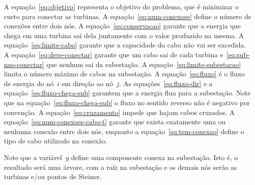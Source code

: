 A equação~\eqref{eq:objetivo} representa o objetivo do problema, que é minimizar o custo para conectar as turbinas.
A equação~\eqref{eq:num-conexoes} define o número de conexões entre dois nós.
A equação~\eqref{eq:conservacao} garante que a energia que chega em uma turbina sai dela juntamente com o valor produzido na mesma.
A equação~\eqref{eq:limite-cabo} garante que a capacidade do cabo não vai ser excedida.
A equação~\eqref{eq:deve-conectar} garante que um cabo sai de cada turbina e~\eqref{eq:sub-nao-conectar} que nenhum sai da subestação.
A equação~\eqref{eq:limite-subestacao} limita o número máximo de cabos na subestação.
A equação~\eqref{eq:fluxo} é o fluxo de energia do nó~$i$ em direção ao nó~$j$.
As equações~\eqref{eq:fluxo-dir} e a equação~\eqref{eq:fluxo-chega-sub} garantem que a energia flua para a subestação.
Note que na equação~\eqref{eq:fluxo-chega-sub} o fluxo no sentido reverso não é negativo por convenção.
A equação~\eqref{eq:cruzamento} impede que hajam cabos cruzados.
A equação~\eqref{eq:num-conexoes-cabo-t} garante que exista exatamente uma ou nenhuma conexão entre dois nós, enquanto a equação~\eqref{eq:tem-conexao} define o tipo de cabo utilizado na conexão.

Note que a variável~$y$ define uma componente conexa na subestação.
Isto é, o resultado será uma árvore, com a raíz na subestação e os demais nós serão as turbinas e/ou pontos de Steiner.
